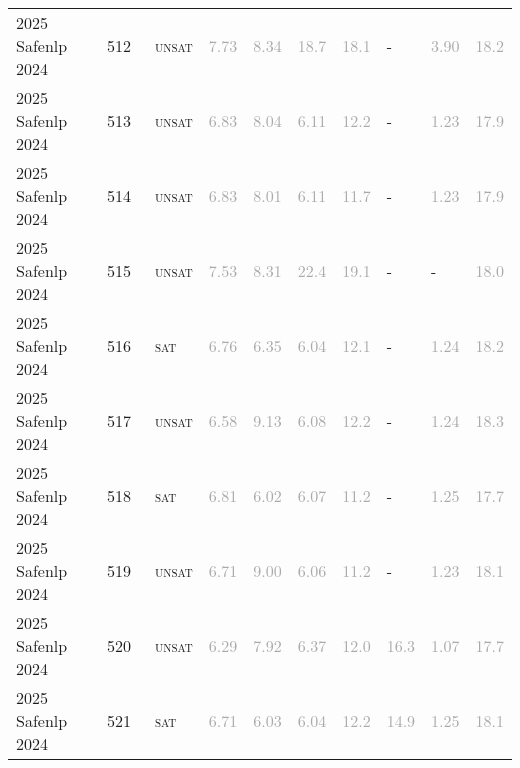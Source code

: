 \begin{center}
{\begin{longtable}{@{}llllllllll@{}}
2025 Safenlp 2024 & 512 & ~\textsc{unsat} & \textcolor{darkgray}{7.73} & \textcolor{darkgray}{8.34} & \textcolor{darkgray}{18.7} & \textcolor{darkgray}{18.1} & - & \textcolor{darkgray}{3.90} & \textcolor{darkgray}{18.2} \\
2025 Safenlp 2024 & 513 & ~\textsc{unsat} & \textcolor{darkgray}{6.83} & \textcolor{darkgray}{8.04} & \textcolor{darkgray}{6.11} & \textcolor{darkgray}{12.2} & - & \textcolor{darkgray}{1.23} & \textcolor{darkgray}{17.9} \\
2025 Safenlp 2024 & 514 & ~\textsc{unsat} & \textcolor{darkgray}{6.83} & \textcolor{darkgray}{8.01} & \textcolor{darkgray}{6.11} & \textcolor{darkgray}{11.7} & - & \textcolor{darkgray}{1.23} & \textcolor{darkgray}{17.9} \\
2025 Safenlp 2024 & 515 & ~\textsc{unsat} & \textcolor{darkgray}{7.53} & \textcolor{darkgray}{8.31} & \textcolor{darkgray}{22.4} & \textcolor{darkgray}{19.1} & - & - & \textcolor{darkgray}{18.0} \\
2025 Safenlp 2024 & 516 & ~\textsc{sat} & \textcolor{darkgray}{6.76} & \textcolor{darkgray}{6.35} & \textcolor{darkgray}{6.04} & \textcolor{darkgray}{12.1} & - & \textcolor{darkgray}{1.24} & \textcolor{darkgray}{18.2} \\
2025 Safenlp 2024 & 517 & ~\textsc{unsat} & \textcolor{darkgray}{6.58} & \textcolor{darkgray}{9.13} & \textcolor{darkgray}{6.08} & \textcolor{darkgray}{12.2} & - & \textcolor{darkgray}{1.24} & \textcolor{darkgray}{18.3} \\
2025 Safenlp 2024 & 518 & ~\textsc{sat} & \textcolor{darkgray}{6.81} & \textcolor{darkgray}{6.02} & \textcolor{darkgray}{6.07} & \textcolor{darkgray}{11.2} & - & \textcolor{darkgray}{1.25} & \textcolor{darkgray}{17.7} \\
2025 Safenlp 2024 & 519 & ~\textsc{unsat} & \textcolor{darkgray}{6.71} & \textcolor{darkgray}{9.00} & \textcolor{darkgray}{6.06} & \textcolor{darkgray}{11.2} & - & \textcolor{darkgray}{1.23} & \textcolor{darkgray}{18.1} \\
2025 Safenlp 2024 & 520 & ~\textsc{unsat} & \textcolor{darkgray}{6.29} & \textcolor{darkgray}{7.92} & \textcolor{darkgray}{6.37} & \textcolor{darkgray}{12.0} & \textcolor{darkgray}{16.3} & \textcolor{darkgray}{1.07} & \textcolor{darkgray}{17.7} \\
2025 Safenlp 2024 & 521 & ~\textsc{sat} & \textcolor{darkgray}{6.71} & \textcolor{darkgray}{6.03} & \textcolor{darkgray}{6.04} & \textcolor{darkgray}{12.2} & \textcolor{darkgray}{14.9} & \textcolor{darkgray}{1.25} & \textcolor{darkgray}{18.1} \\

\end{longtable}}
\end{center}
